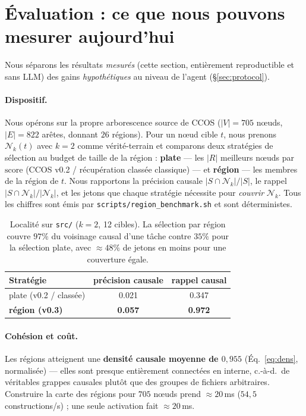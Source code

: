 \documentclass[11pt]{article}
\newcommand{\Nk}{\mathcal{N}_k}
\newcommand{\code}[1]{\texttt{#1}}
\begin{document}
\section{Évaluation : ce que nous pouvons mesurer aujourd'hui}\label{sec:eval}

Nous séparons les résultats \emph{mesurés} (cette section, entièrement reproductible
et sans LLM) des gains \emph{hypothétiques} au niveau de l'agent (\S\ref{sec:protocol}).

\paragraph{Dispositif.} Nous opérons sur la propre arborescence source de CCOS
($|V|=705$ nœuds, $|E|=822$ arêtes, donnant $26$ régions). Pour un nœud cible $t$,
nous prenons $\Nk(t)$ avec $k=2$ comme vérité-terrain et comparons deux stratégies de
sélection au budget de taille de la région : \textbf{plate} --- les $|R|$ meilleurs
nœuds par $\mathrm{score}$ (CCOS v0.2 / récupération classée classique) --- et
\textbf{région} --- les membres de la région de $t$. Nous rapportons la précision
causale $|S\cap\Nk|/|S|$, le rappel $|S\cap\Nk|/|\Nk|$, et les jetons que chaque
stratégie nécessite pour \emph{couvrir} $\Nk$. Tous les chiffres sont émis par
\code{scripts/region\_benchmark.sh} et sont déterministes.

\begin{table}[h]
\centering
\begin{tabular}{lcc}
\toprule
Stratégie & précision causale & rappel causal \\
\midrule
plate (v0.2 / classée) & 0.021 & 0.347 \\
\textbf{région (v0.3)} & \textbf{0.057} & \textbf{0.972} \\
\bottomrule
\end{tabular}
\caption{Localité sur \code{src/} ($k=2$, 12 cibles). La sélection par région couvre
$97\%$ du voisinage causal d'une tâche contre $35\%$ pour la sélection plate, avec
$\approx\!48\%$ de jetons en moins pour une couverture égale.}
\label{tab:locality}
\end{table}

\paragraph{Cohésion et coût.} Les régions atteignent une \textbf{densité causale
moyenne de $0{,}955$} (Éq.~\ref{eq:dens}, normalisée) --- elles sont presque
entièrement connectées en interne, c.-à-d.\ de véritables grappes causales plutôt que
des groupes de fichiers arbitraires. Construire la carte des régions pour $705$ nœuds
prend $\approx\!20$\,ms ($54{,}5$ constructions/s) ; une seule activation fait
$\approx\!20$\,ms.
\end{document}

